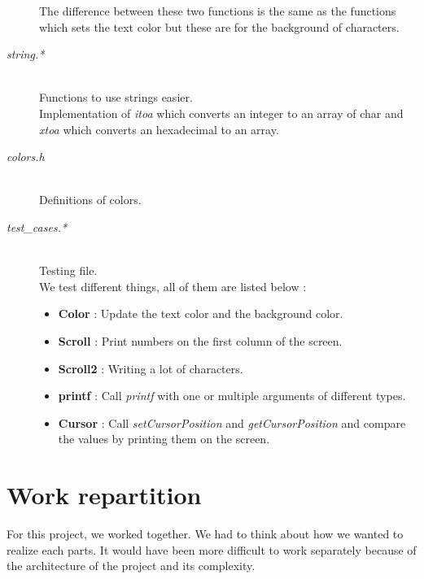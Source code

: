 \documentclass[a4paper]{article}
\begin{document}
\begin{description}
The difference between these two functions is the same as the functions which sets the text color but these are for the background of characters.

\item[\textit{string.*}] \hfill \\
Functions to use strings easier. \\
Implementation of \textit{itoa} which converts an integer to an array of char and \textit{xtoa} which converts an hexadecimal to an array.

\item[\textit{colors.h}] \hfill \\
Definitions of colors.

\item[\textit{test\_cases.*}] \hfill \\
Testing file.\\
We test different things, all of them are listed below :
\begin{itemize}
\item \textbf{Color} : Update the text color and the background color.
\item \textbf{Scroll} : Print numbers on the first column of the screen.
\item \textbf{Scroll2} : Writing a lot of characters.
\item \textbf{printf} : Call \textit{printf} with one or multiple arguments of different types.
\item \textbf{Cursor} : Call \textit{setCursorPosition} and \textit{getCursorPosition} and compare the values by printing them on the screen.
\end{itemize}

\end{description}

\section{Work repartition}
For this project, we worked together. We had to think about how we wanted to realize each parts. It would have been more difficult to work separately because of the architecture of the project and its complexity.
\end{document}
